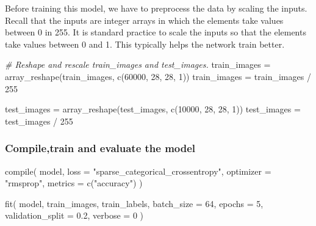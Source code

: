 \documentclass[
  a4paper,
]{article}
\newenvironment{Shaded}{\begin{snugshade}}{\end{snugshade}}
\newcommand{\AttributeTok}[1]{\textcolor[rgb]{0.77,0.63,0.00}{#1}}
\newcommand{\CommentTok}[1]{\textcolor[rgb]{0.56,0.35,0.01}{\textit{#1}}}
\newcommand{\DecValTok}[1]{\textcolor[rgb]{0.00,0.00,0.81}{#1}}
\newcommand{\FloatTok}[1]{\textcolor[rgb]{0.00,0.00,0.81}{#1}}
\newcommand{\FunctionTok}[1]{\textcolor[rgb]{0.00,0.00,0.00}{#1}}
\newcommand{\NormalTok}[1]{#1}
\newcommand{\OtherTok}[1]{\textcolor[rgb]{0.56,0.35,0.01}{#1}}
\newcommand{\SpecialCharTok}[1]{\textcolor[rgb]{0.00,0.00,0.00}{#1}}
\newcommand{\StringTok}[1]{\textcolor[rgb]{0.31,0.60,0.02}{#1}}
\begin{document}
Before training this model, we have to preprocess the data by scaling
the inputs. Recall that the inputs are integer arrays in which the
elements take values between 0 in 255. It is standard practice to scale
the inputs so that the elements take values between 0 and 1. This
typically helps the network train better.

\begin{Shaded}
\begin{Highlighting}[]
\CommentTok{\# Reshape and rescale train\_images and test\_images.}
\NormalTok{train\_images }\OtherTok{=} \FunctionTok{array\_reshape}\NormalTok{(train\_images, }\FunctionTok{c}\NormalTok{(}\DecValTok{60000}\NormalTok{, }\DecValTok{28}\NormalTok{, }\DecValTok{28}\NormalTok{, }\DecValTok{1}\NormalTok{))}
\NormalTok{train\_images }\OtherTok{=}\NormalTok{ train\_images }\SpecialCharTok{/} \DecValTok{255}

\NormalTok{test\_images }\OtherTok{=} \FunctionTok{array\_reshape}\NormalTok{(test\_images, }\FunctionTok{c}\NormalTok{(}\DecValTok{10000}\NormalTok{, }\DecValTok{28}\NormalTok{, }\DecValTok{28}\NormalTok{, }\DecValTok{1}\NormalTok{))}
\NormalTok{test\_images }\OtherTok{=}\NormalTok{ test\_images }\SpecialCharTok{/} \DecValTok{255}
\end{Highlighting}
\end{Shaded}

\hypertarget{compiletrain-and-evaluate-the-model}{%
\subsubsection{Compile,train and evaluate the
model}\label{compiletrain-and-evaluate-the-model}}

\begin{Shaded}
\begin{Highlighting}[]
\FunctionTok{compile}\NormalTok{(}
\NormalTok{  model,}
  \AttributeTok{loss =} \StringTok{"sparse\_categorical\_crossentropy"}\NormalTok{,}
  \AttributeTok{optimizer =} \StringTok{"rmsprop"}\NormalTok{,}
  \AttributeTok{metrics =} \FunctionTok{c}\NormalTok{(}\StringTok{"accuracy"}\NormalTok{)}
\NormalTok{)}
\end{Highlighting}
\end{Shaded}

\begin{Shaded}
\begin{Highlighting}[]
\FunctionTok{fit}\NormalTok{(}
\NormalTok{  model,}
\NormalTok{  train\_images, train\_labels,}
  \AttributeTok{batch\_size =} \DecValTok{64}\NormalTok{,}
  \AttributeTok{epochs =} \DecValTok{5}\NormalTok{,}
  \AttributeTok{validation\_split =} \FloatTok{0.2}\NormalTok{,}
  \AttributeTok{verbose =} \DecValTok{0}
\NormalTok{)}
\end{Highlighting}
\end{Shaded}
\end{document}
